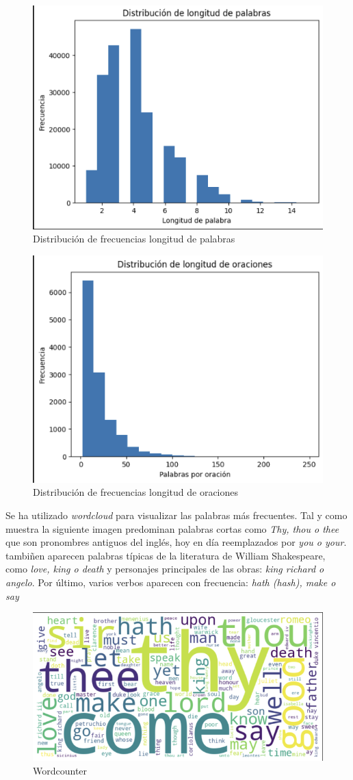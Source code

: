 \documentclass[11pt]{book}
\begin{document}
\begin{figure}[h]
    \centering
    \includegraphics[width=0.5\linewidth]{img/hist_long_w_shake.png}
    \caption{Distribución de frecuencias longitud de palabras}
    \label{fig:placeholder34}
\end{figure}

\begin{figure}[h]
    \centering
    \includegraphics[width=0.5\linewidth]{img/hist_long_s_shake.png}
    \caption{Distribución de frecuencias longitud de oraciones}
    \label{fig:placeholder35}
\end{figure}

Se ha utilizado \textit{wordcloud} para visualizar las palabras más frecuentes. Tal y como muestra la siguiente imagen predominan palabras cortas como \textit{Thy, thou o thee} que son pronombres antiguos del inglés, hoy en día reemplazados por \textit{you o your}. tambiñen aparecen palabras típicas de la literatura de William Shakespeare, como \textit{love, king o death} y personajes principales de las obras: \textit{king richard o angelo}. Por último, varios verbos aparecen con frecuencia: \textit{hath (hash), make o say}

\begin{figure}[h]
    \centering
    \includegraphics[width=0.5\linewidth]{img/word_count_shake.png}
    \caption{Wordcounter}
    \label{fig:placeholder36}
\end{figure}
\end{document}
